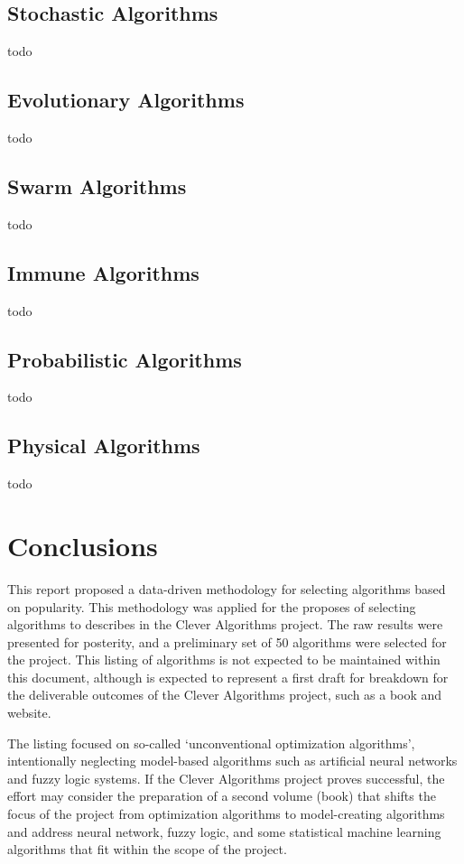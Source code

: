 \documentclass[a4paper, 11pt]{article}
\begin{document}
\subsection{Stochastic Algorithms}
todo

\subsection{Evolutionary Algorithms}
todo

\subsection{Swarm Algorithms}
todo

\subsection{Immune Algorithms}
todo

\subsection{Probabilistic Algorithms}
todo

\subsection{Physical Algorithms}
todo

% 
% 
\section{Conclusions}
\label{sec:conclusions}
This report proposed a data-driven methodology for selecting algorithms based on popularity. This methodology was applied for the proposes of selecting algorithms to describes in the Clever Algorithms project. The raw results were presented for posterity, and a preliminary set of 50 algorithms were selected for the project. This listing of algorithms is not expected to be maintained within this document, although is expected to represent a first draft for breakdown for the deliverable outcomes of the Clever Algorithms project, such as a book and website. 

The listing focused on so-called `unconventional optimization algorithms', intentionally neglecting model-based algorithms such as artificial neural networks and fuzzy logic systems. If the Clever Algorithms project proves successful, the effort may consider the preparation of a second volume (book) that shifts the focus of the project from optimization algorithms to model-creating algorithms and address neural network, fuzzy logic, and some statistical machine learning algorithms that fit within the scope of the project.



\end{document}
